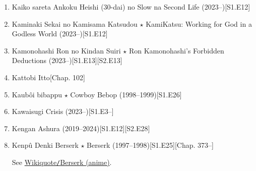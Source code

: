 \documentclass{article}
\begin{document}
\begin{enumerate}
    \item Kaiko sareta Ankoku Heishi (30-dai) no Slow na Second Life (2023--)\hfill[S1.E12]
    \item {\sc Kaminaki Sekai no Kamisama Katsudou $\star$ KamiKatsu: Working for God in a Godless World} (2023--)\hfill[S1.E12]
    \item {\sc Kamonohashi Ron no Kindan Suiri $\star$ Ron Kamonohashi's Forbidden Deductions} (2023--)\hfill[S1.E13][S2.E13]
    \item {\sc Kattobi Itto}\hfill[Chap. 102]
    \item {\sc Kaub\^oi bibappu $\star$ Cowboy Bebop} (1998--1999)\hfill[S1.E26]
    \item Kawaisugi Crisis (2023--)\hfill[S1.E3--]
    \item {\sc Kengan Ashura} (2019--2024)\hfill[S1.E12][S2.E28]
    \item {\sc Kenp\^u Denki Berserk $\star$ Berserk} (1997--1998)\hfill[S1.E25][Chap. 373--]
    
    See \href{https://en.wikiquote.org/wiki/Berserk_(anime)}{Wikiquote{\tt/}Berserk (anime)}.
    

\end{enumerate}
\end{document}
